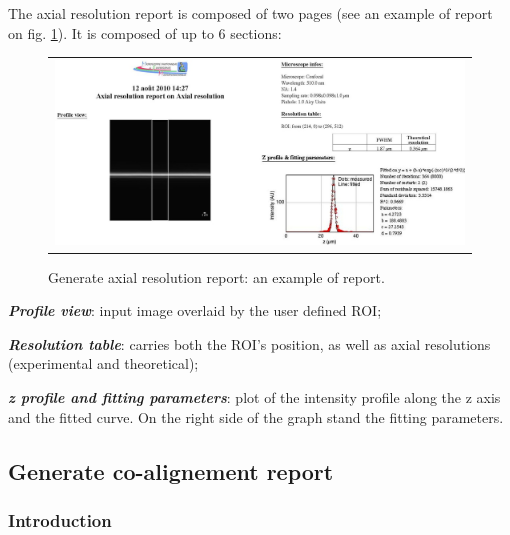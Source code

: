 \documentclass[]{spie}
\begin{document}
The axial resolution report is composed of two pages (see an example of report on fig. \ref{fig:garr-report}). It is composed of up to 6 sections:
\begin{figure}[h]
		\begin{center}
		\begin{tabular}{c}
			\includegraphics[width=0.9\linewidth]{img/garr-report}
		\end{tabular}
	\end{center}
	\caption{\label{fig:garr-report}Generate axial resolution report: an example of report.}
\end{figure} 
\begin{itemize*}
	\item \textbf{\textit{Profile view}}: input image overlaid by the user defined ROI;
	\item \textbf{\textit{Resolution table}}: carries both the ROI's position, as well as axial resolutions (experimental and theoretical);
	\item \textbf{\textit{z profile and fitting parameters}}: plot of the intensity profile along the z axis and the fitted curve. On the right side of the graph stand the fitting parameters.
\end{itemize*}

\subsection{Generate co-alignement report}
\label{subsec:gcoar}

\subsubsection*{Introduction}
\label{subsubsec:gcoar-intro}
\end{document}
